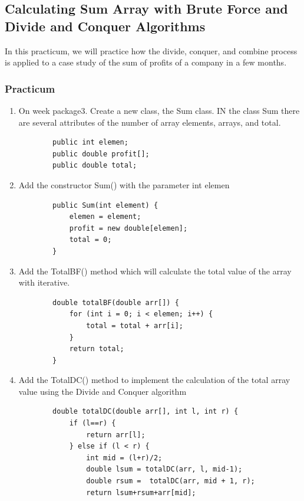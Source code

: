 \documentclass[12pt,titlepage]{article}
\begin{document}
\subsection{Calculating Sum Array with Brute Force and Divide and Conquer Algorithms}
In this practicum, we will practice how the divide, conquer, and combine process is applied to a case study of the sum of profits of a company in a few months.

\subsubsection{Practicum}

\begin{enumerate}
    \item On week package3. Create a new class, the Sum class. IN the class Sum there are several attributes of the number of array elements, arrays, and total.
    \begin{verbatim}
        public int elemen;
        public double profit[];
        public double total;
    \end{verbatim}
    \item Add the constructor Sum() with the parameter int elemen
    \begin{verbatim}
        public Sum(int element) {
            elemen = element;
            profit = new double[elemen];
            total = 0;
        }
    \end{verbatim}
    \item Add the TotalBF() method which will calculate the total value of the array with iterative.
    \begin{verbatim}
        double totalBF(double arr[]) {
            for (int i = 0; i < elemen; i++) {
                total = total + arr[i];
            }
            return total;
        }
    \end{verbatim}
    \item Add the TotalDC() method to implement the calculation of the total array value using the Divide and Conquer algorithm
    \begin{verbatim}
        double totalDC(double arr[], int l, int r) {
            if (l==r) {
                return arr[l];
            } else if (l < r) {
                int mid = (l+r)/2;
                double lsum = totalDC(arr, l, mid-1);
                double rsum =  totalDC(arr, mid + 1, r);
                return lsum+rsum+arr[mid];

\end{verbatim}
\end{enumerate}
\end{document}
